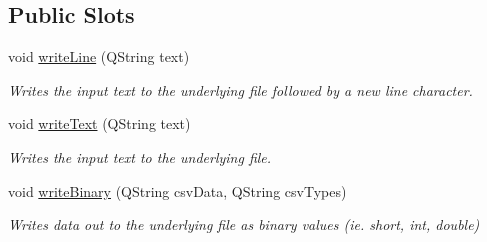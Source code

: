 \subsection*{Public Slots}
\begin{DoxyCompactItemize}
\item 
\hypertarget{class_picto_1_1_analysis_file_output_afd357d2fb660be88ad81d589720bd123}{void \hyperlink{class_picto_1_1_analysis_file_output_afd357d2fb660be88ad81d589720bd123}{write\-Line} (Q\-String text)}\label{class_picto_1_1_analysis_file_output_afd357d2fb660be88ad81d589720bd123}

\begin{DoxyCompactList}\small\item\em Writes the input text to the underlying file followed by a new line character. \end{DoxyCompactList}\item 
void \hyperlink{class_picto_1_1_analysis_file_output_a3a9ea552a091035c48e135f248d6433c}{write\-Text} (Q\-String text)
\begin{DoxyCompactList}\small\item\em Writes the input text to the underlying file. \end{DoxyCompactList}\item 
void \hyperlink{class_picto_1_1_analysis_file_output_aa4249731a0bfdca39fe880af06717f07}{write\-Binary} (Q\-String csv\-Data, Q\-String csv\-Types)
\begin{DoxyCompactList}\small\item\em Writes data out to the underlying file as binary values (ie. short, int, double) \end{DoxyCompactList}\end{DoxyCompactItemize}
